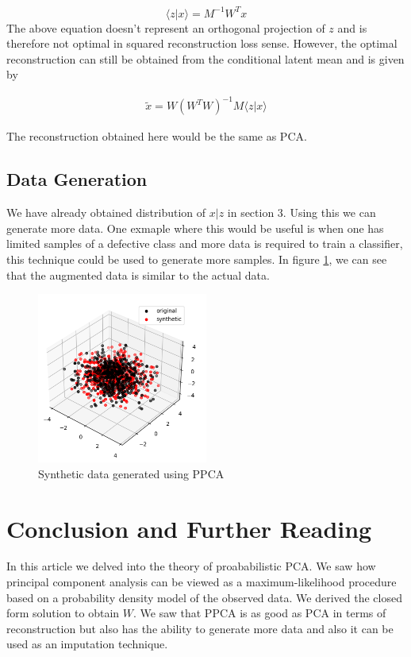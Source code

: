 \documentclass[10pt,onecolumn,letterpaper]{article}
\begin{document}
$$\langle z|x \rangle = M^{-1}W^Tx$$
The above equation doesn't represent an orthogonal projection of $z$ and is therefore not optimal in squared reconstruction loss sense. However, the optimal reconstruction can still be obtained from the conditional latent mean and is given by

\begin{align}
\tilde x = W (W^TW)^{-1}M \langle z|x \rangle
\end{align}

The reconstruction obtained here would be the same as PCA.

\subsection{Data Generation}
We have already obtained distribution of $x|z$ in section 3. Using this we can generate more data. One exmaple where this would be useful is when one has limited samples of a defective class and more data is required to train a classifier, this technique could be used to generate more samples. In figure \ref{fig:data_gen}, we can see that the augmented data is similar to the actual data.

\begin{figure}
    \centering
    \includegraphics[width=0.5\textwidth]{./data_gen.png}
    \caption{Synthetic data generated using PPCA}
    \label{fig:data_gen}
\end{figure}

\section{Conclusion and Further Reading}
In this article we delved into the theory of proababilistic PCA. We saw how principal component analysis can be viewed as a maximum-likelihood procedure based on a probability density model of the observed data. We derived the closed form solution to obtain $W$. We saw that PPCA is as good as PCA in terms of reconstruction but also has the ability to generate more data and also it can be used as an imputation technique.
\end{document}
